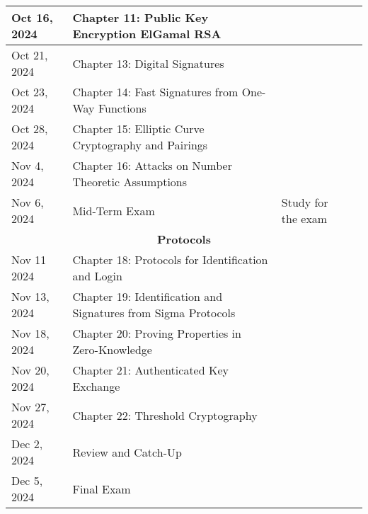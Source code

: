 \documentclass{article}
\begin{document}
\begin{center}
\begin{adjustbox}{width=\textwidth}
\begin{tabular}{|l|p{}|l|l|}
  \hline
  Oct 16, 2024 & Chapter 11: Public Key Encryption  \newline ElGamal \newline RSA               &  &\\
  \hline
  Oct 21, 2024  & Chapter 13: Digital Signatures                      & &\\
  \hline
  Oct 23, 2024  & Chapter 14: Fast Signatures from One-Way Functions   && \\
  \hline
  Oct 28, 2024  & Chapter 15: Elliptic Curve Cryptography and Pairings && \\
  \hline
  Nov 4, 2024  & Chapter 16: Attacks on Number Theoretic Assumptions  && \\

  \hline
  Nov 6, 2024   & Mid-Term Exam                                       & Study for the exam& \\
     \hline
  \multicolumn{4}{|c|}{\textbf{Protocols}} \\  %
  \hline
  Nov 11 2024   & Chapter 18: Protocols for Identification and Login   && \\
  \hline
  Nov 13, 2024  & Chapter 19: Identification and Signatures from Sigma Protocols && \\
  \hline
  Nov 18, 2024  & Chapter 20: Proving Properties in Zero-Knowledge    & &\\
  \hline
  Nov 20, 2024  & Chapter 21: Authenticated Key Exchange               & &\\
  \hline
  Nov 27, 2024  & Chapter 22: Threshold Cryptography                              && \\
  \hline
  Dec 2, 2024   & Review and Catch-Up                                 && \\
  \hline
  Dec 5, 2024   & Final Exam                                          & &\\
  \hline
\end{tabular}
\end{adjustbox}
\end{center}
\end{document}
